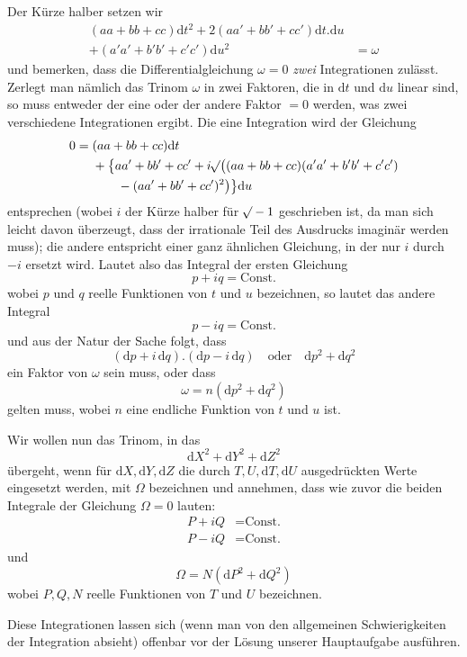 Der Kürze halber setzen wir
\[
\begin{aligned}
(aa+bb+cc)\mathrm{d}t^2+2(aa'+bb'+cc')\mathrm{d}t\mathord{.}\mathrm{d}u&\\
+(a'a'+b'b'+c'c')\mathrm{d}u^2&=\omega
\end{aligned}
\]
\noindent und bemerken, dass die Differentialgleichung \(\omega=0\) \textit{zwei} Integrationen zulässt. Zerlegt man nämlich das Trinom \(\omega\) in zwei Faktoren, die in
\(\mathrm{d}t\) und \(\mathrm{d}u\) linear sind, so muss entweder der eine oder der andere Faktor \(=0\) werden, was zwei verschiedene Integrationen ergibt. Die eine Integration wird der Gleichung
\[
\begin{aligned}
0={}&(aa+bb+cc)\mathrm{d}t\\
&+\bigl\{aa'+bb'+cc'+i\mathord{{}^{}\!\surd}\bigl((aa+bb+cc)(a'a'+b'b'+c'c')\\
&\qquad-(aa'+bb'+cc')^2\bigr)\bigr\}\mathrm{d}u
\end{aligned}
\]
\noindent entsprechen (wobei \(i\) der Kürze halber für \(\mathord{{}^{}\!\surd}-1\) geschrieben ist, da man sich leicht davon überzeugt, dass der irrationale Teil des Ausdrucks imaginär werden muss); die andere entspricht einer ganz ähnlichen Gleichung, in der nur \(i\) durch \(-i\) ersetzt wird. Lautet also das Integral der ersten Gleichung
\[
p+iq=\text{Const.}
\]
\noindent wobei \(p\) und \(q\) reelle Funktionen von \(t\) und \(u\) bezeichnen, so lautet das andere Integral
\[
p-iq=\text{Const.}
\]
\noindent und aus der Natur der Sache folgt, dass
\[
(\mathrm{d}p+i\,\mathrm{d}q)\mathord{.}(\mathrm{d}p-i\,\mathrm{d}q)\quad\text{oder}\quad\mathrm{d}p^2+\mathrm{d}q^2
\]
\noindent ein Faktor von \(\omega\) sein muss, oder dass
\[
\omega=n(\mathrm{d}p^2+\mathrm{d}q^2)
\]
\noindent gelten muss, wobei \(n\) eine endliche Funktion von \(t\) und \(u\) ist.

Wir wollen nun das Trinom, in das
\[
\mathrm{d}X^2+\mathrm{d}Y^2+\mathrm{d}Z^2
\]
\noindent übergeht, wenn für \(\mathrm{d}X,\mathrm{d}Y,\mathrm{d}Z\) die durch \(T,U,\mathrm{d}T,\mathrm{d}U\) ausgedrückten Werte eingesetzt werden, mit \(\Omega\) bezeichnen und annehmen, dass wie zuvor die beiden Integrale der Gleichung \(\Omega=0\) lauten:
\[
\begin{aligned}
P+iQ&=\text{Const.}\\
P-iQ&=\text{Const.}
\end{aligned}
\]
\noindent und
\[
\Omega=N(\mathrm{d}P^2+\mathrm{d}Q^2)
\]
\noindent wobei \(P,Q,N\) reelle Funktionen von \(T\) und \(U\) bezeichnen.
\par\indent{}%
Diese Integrationen lassen sich (wenn man von den allgemeinen Schwierigkeiten der Integration absieht) offenbar vor der Lösung unserer Hauptaufgabe ausführen.

